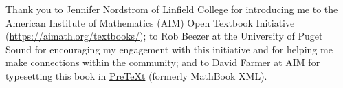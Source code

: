 \documentclass[openany, oneside]{book}
\begin{document}
\bigskip
\noindent
Thank you to Jennifer Nordstrom of Linfield College for introducing me to the American Institute of Mathematics (AIM) Open Textbook Initiative (\url{https://aimath.org/textbooks/}); to Rob Beezer at the University of Puget Sound for encouraging my engagement with this initiative and for helping me make connections within the community; and to David Farmer at AIM for typesetting this book in \href{http://mathbook.pugetsound.edu}{PreTeXt} (formerly MathBook XML).

\vfill \vfill \vfill

  \tableofcontents
\mainmatter












\backmatter
\appendix

\pagestyle{fancy}
\lhead{}
\chead{}
\rhead{\thepage}
\lfoot{}
\cfoot{}
\rfoot{}
\renewcommand{\headrulewidth}{0pt}

\thispagestyle{plain}
{}



\begin{comment}


\chapter{Proof that $S_0$ is trivial}

By definition, $S_0$ is the set of permutations of the empty set, that is, the set of all bijections from $\emptyset$ to $\emptyset$.  If we go back to the true definition of a function, we recall that a function from a set $A$ to itself is a relation $f$ on $A$ (that is, a subset of $A \times A$) such that for each $a\in A$, there is a unique $b\in A$ such that $(a,b)\in f$.

So let A be the empty set.  Then $A \times A$ is also the empty set (do you see why?). Now,  $f=\emptyset$ is a subset of $A \times A$, and it is vacuously true that $f$ has the property that for each $a\in A$, there is a unique $b\in A$ such that $(a,b)\in f$ (it is vacuously true since there are no elements of $A$).  So $f$ is a function from $A$ to $A$. Since there is no other subset of $A \times A$, $f$ is the only function from $A$ to $A$.

The remaining question is: Is  $f$ a permutation on $A$; that is, is $f$ a bijection?  The answer is yes: $f$ is both vacuously onto and vacuously one-to-one.  So there is a unique bijection from $\emptyset$ to $\emptyset$. Formally, it's the subset $\emptyset$ of $\emptyset \times \emptyset$.  Informally, it's the unique map that doesn't send anything anywhere.

Thus, $S_0$ contains exactly one element, and hence is the trivial group.
\end{comment}
{}
\end{document}
